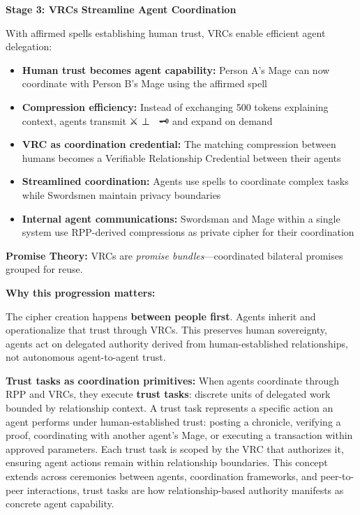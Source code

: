 \documentclass[
]{article}
\begin{document}
\textbf{Stage 3: VRCs Streamline Agent Coordination}

With affirmed spells establishing human trust, VRCs enable efficient
agent delegation:

\begin{itemize}
\item
  \textbf{Human trust becomes agent capability:} Person A's Mage can now
  coordinate with Person B's Mage using the affirmed spell
\item
  \textbf{Compression efficiency:} Instead of exchanging 500 tokens
  explaining context, agents transmit ⚔️ ⊥ 🔮 \textbar{} 🗝️ and expand
  on demand
\item
  \textbf{VRC as coordination credential:} The matching compression
  between humans becomes a Verifiable Relationship Credential between
  their agents
\item
  \textbf{Streamlined coordination:} Agents use spells to coordinate
  complex tasks while Swordsmen maintain privacy boundaries
\item
  \textbf{Internal agent communications:} Swordsman and Mage within a
  single system use RPP-derived compressions as private cipher for their
  coordination
\end{itemize}

\textbf{Promise Theory:} VRCs are \emph{promise bundles}---coordinated
bilateral promises grouped for reuse.

\textbf{Why this progression matters:}

The cipher creation happens \textbf{between people first}. Agents
inherit and operationalize that trust through VRCs. This preserves human
sovereignty, agents act on delegated authority derived from
human-established relationships, not autonomous agent-to-agent trust.

\textbf{Trust tasks as coordination primitives:} When agents coordinate
through RPP and VRCs, they execute \textbf{trust tasks}: discrete units
of delegated work bounded by relationship context. A trust task
represents a specific action an agent performs under human-established
trust: posting a chronicle, verifying a proof, coordinating with another
agent's Mage, or executing a transaction within approved parameters.
Each trust task is scoped by the VRC that authorizes it, ensuring agent
actions remain within relationship boundaries. This concept extends
across ceremonies between agents, coordination frameworks, and
peer-to-peer interactions, trust tasks are how relationship-based
authority manifests as concrete agent capability.
\end{document}
